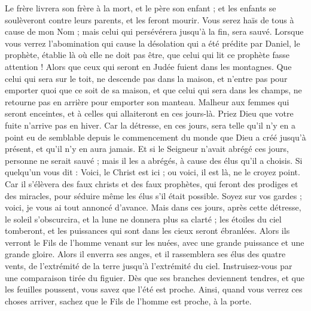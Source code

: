\begin{multicols}{2}
Le frère livrera son frère à la mort, et le père son enfant ; et les enfants se soulèveront contre leurs parents, et les feront mourir.
Vous serez haïs de tous à cause de mon Nom ; mais celui qui persévérera jusqu’à la fin, sera sauvé.
Lorsque vous verrez l'abomination qui cause la désolation{} qui a été prédite par Daniel, le prophète, établie là où elle ne doit pas être, que celui qui lit ce prophète fasse attention ! Alors que ceux qui seront en Judée fuient dans les montagnes.
Que celui qui sera sur le toit, ne descende pas dans la maison, et n’entre pas pour emporter quoi que ce soit de sa maison,
et que celui qui sera dans les champs, ne retourne pas en arrière pour emporter son manteau.
Malheur aux femmes qui seront enceintes, et à celles qui allaiteront en ces jours-là.
Priez Dieu que votre fuite n'arrive pas en hiver.
Car la détresse, en ces jours, sera telle qu’il n’y en a point eu de semblable depuis le commencement du monde que Dieu a créé jusqu’à présent, et qu’il n’y en aura jamais.
Et si le Seigneur n’avait abrégé ces jours, personne ne serait sauvé ; mais il les a abrégés, à cause des élus qu'il a choisis.
Si quelqu'un vous dit : Voici, le Christ est ici ; ou voici, il est là, ne le croyez point.
Car il s'élèvera des faux christs et des faux prophètes, qui feront des prodiges et des miracles, pour séduire même les élus s'il était possible.
Soyez sur vos gardes ; voici, je vous ai tout annoncé d’avance.
Mais dans ces jours, après cette détresse, le soleil s’obscurcira, et la lune ne donnera plus sa clarté ;
les étoiles du ciel tomberont, et les puissances qui sont dans les cieux seront ébranlées.
Alors ils verront le Fils de l'homme venant sur les nuées, avec une grande puissance et une grande gloire.
Alors il enverra ses anges, et il rassemblera ses élus des quatre vents, de l’extrémité de la terre jusqu’à l’extrémité du ciel.
Instruisez-vous par une comparaison tirée du figuier. Dès que ses branches deviennent tendres, et que les feuilles poussent, vous savez que l'été est proche.
Ainsi, quand vous verrez ces choses arriver, sachez que le Fils de l’homme est proche, à la porte.

\end{multicols}
